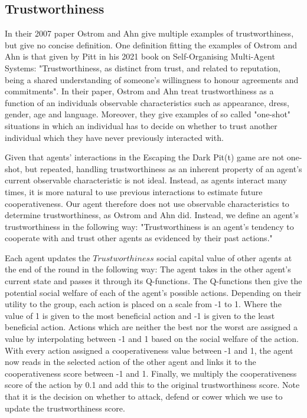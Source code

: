 \subsection{Trustworthiness}

In their 2007 paper Ostrom and Ahn give multiple examples of trustworthiness, but give no concise definition. One definition fitting the examples of Ostrom and Ahn is that given by Pitt in his 2021 book on Self-Organising Multi-Agent Systems: "Trustworthiness, as distinct from trust, and related to reputation, being a shared understanding of someone’s willingness to honour agreements and commitments"\cite{pitt}. In their paper, Ostrom and Ahn treat trustworthiness as a function of an individuals observable characteristics such as appearance, dress, gender, age and language. Moreover, they give examples of so called "one-shot" situations in which an individual has to decide on whether to trust another individual which they have never previously interacted with.\cite{ostrom-ahn}

Given that agents' interactions in the Escaping the Dark Pit(t) game are not one-shot, but repeated, handling trustworthiness as an inherent property of an agent's current observable characteristic is not ideal. Instead, as agents interact many times, it is more natural to use previous interactions to estimate future cooperativeness. Our agent therefore does not use observable characteristics to determine trustworthiness, as Ostrom and Ahn did. Instead, we define an agent's trustworthiness in the following way: "Trustworthiness is an agent's tendency to cooperate with and trust other agents as evidenced by their past actions."

Each agent updates the $Trustworthiness$ social capital value of other agents at the end of the round in the following way: The agent takes in the other agent's current state and passes it through its Q-functions. The Q-functions then give the potential social welfare of each of the agent's possible actions. Depending on their utility to the group, each action is placed on a scale from -1 to 1. Where the value of 1 is given to the most beneficial action and -1 is given to the least beneficial action. Actions which are neither the best nor the worst are assigned a value by interpolating between -1 and 1 based on the social welfare of the action. With every action assigned a cooperativeness value between -1 and 1, the agent now reads in the selected action of the other agent and links it to the cooperativeness score between -1 and 1. Finally, we multiply the cooperativeness score of the action by 0.1 and add this to the original trustworthiness score. Note that it is the decision on whether to attack, defend or cower which we use to update the trustworthiness score.

